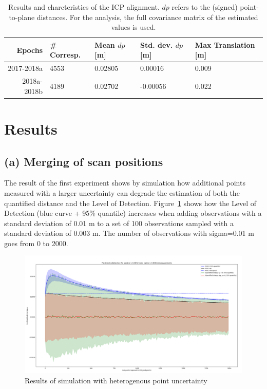 \documentclass[preprint,12pt,3p]{elsarticle}
\begin{document}
\begin{table}[h!]
\begin{tabular}{r|llll}
\textbf{Epochs} & \textbf{\# Corresp.} & \textbf{Mean $dp$ [m]} & \textbf{Std. dev. $dp$ [m]} & \textbf{Max Translation [m]} \\ \hline
2017-2018a      & 4553                & 0.02805                & 0.00016                     & 0.009                        \\
2018a-2018b     & 4189                & 0.02702                & -0.00056                    & 0.022                       
\end{tabular}
\caption{Results and charcteristics of the ICP alignment. $dp$ refers to the (signed) point-to-plane distances. For the analysis, the full covariance matrix of the estimated values is used.}
\label{tab:ICP_results}
\end{table}


\section{Results}
\subsection{(a) Merging of scan positions}
The result of the first experiment shows by simulation how additional points measured with a larger uncertainty can degrade the estimation of both the quantified distance and the Level of Detection. Figure~\ref{fig:plot_a} shows how the Level of Detection (blue curve + 95\% quantile) increases when adding observations with a standard deviation of 0.01 m to a set of 100 observations sampled with a standard deviation of 0.003 m. The number of observations with sigma=0.01 m goes from 0 to 2000. 

\begin{figure}
    \centering
    \includegraphics[width=0.9\linewidth]{figs/experiment1.png}
    \caption{Results of simulation with heterogenous point uncertainty}
    \label{fig:plot_a}
\end{figure}
\end{document}
